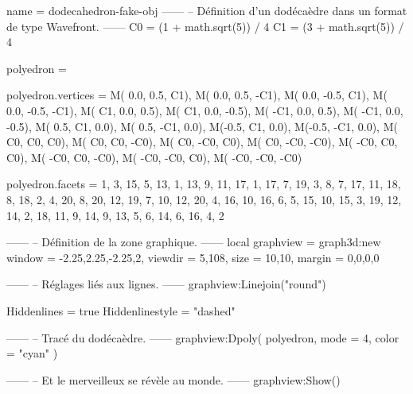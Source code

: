 \documentclass{standalone}
\begin{document}
\begin{luadraw}{name = dodecahedron-fake-obj}
------
-- Définition d'un dodécaèdre dans un format de type Wavefront.
------
C0 = (1 + math.sqrt(5)) / 4
C1 = (3 + math.sqrt(5)) / 4

polyedron = {}

polyedron.vertices = {
  M( 0.0,  0.5,   C1),
  M( 0.0,  0.5,  -C1),
  M( 0.0, -0.5,   C1),
  M( 0.0, -0.5,  -C1),
  M(  C1,  0.0,  0.5),
  M(  C1,  0.0, -0.5),
  M( -C1,  0.0,  0.5),
  M( -C1,  0.0, -0.5),
  M( 0.5,   C1,  0.0),
  M( 0.5,  -C1,  0.0),
  M(-0.5,   C1,  0.0),
  M(-0.5,  -C1,  0.0),
  M(  C0,   C0,   C0),
  M(  C0,   C0,  -C0),
  M(  C0,  -C0,   C0),
  M(  C0,  -C0,  -C0),
  M( -C0,   C0,   C0),
  M( -C0,   C0,  -C0),
  M( -C0,  -C0,   C0),
  M( -C0,  -C0,  -C0)
}

polyedron.facets = {
  {  1,  3, 15,  5, 13},
  {  1, 13,  9, 11, 17},
  {  1, 17,  7, 19,  3},
  {  8,  7, 17, 11, 18},
  {  8, 18,  2,  4, 20},
  {  8, 20, 12, 19,  7},
  { 10, 12, 20,  4, 16},
  { 10, 16,  6,  5, 15},
  { 10, 15,  3, 19, 12},
  { 14,  2, 18, 11,  9},
  { 14,  9, 13,  5,  6},
  { 14,  6, 16,  4,  2}
}

------
-- Définition de la zone graphique.
------
local graphview = graph3d:new{
  window  = {-2.25,2.25,-2.25,2},
  viewdir = {5,108},
  size    = {10,10},
  margin  = {0,0,0,0}
}

------
-- Réglages liés aux lignes.
------
graphview:Linejoin("round")

Hiddenlines     = true
Hiddenlinestyle = "dashed"

------
-- Tracé du dodécaèdre.
------
graphview:Dpoly(
  polyedron,
  {
    mode  = 4,
    color = "cyan"
  })

------
-- Et le merveilleux se révèle au monde.
------
graphview:Show()
\end{luadraw}
\end{document}
